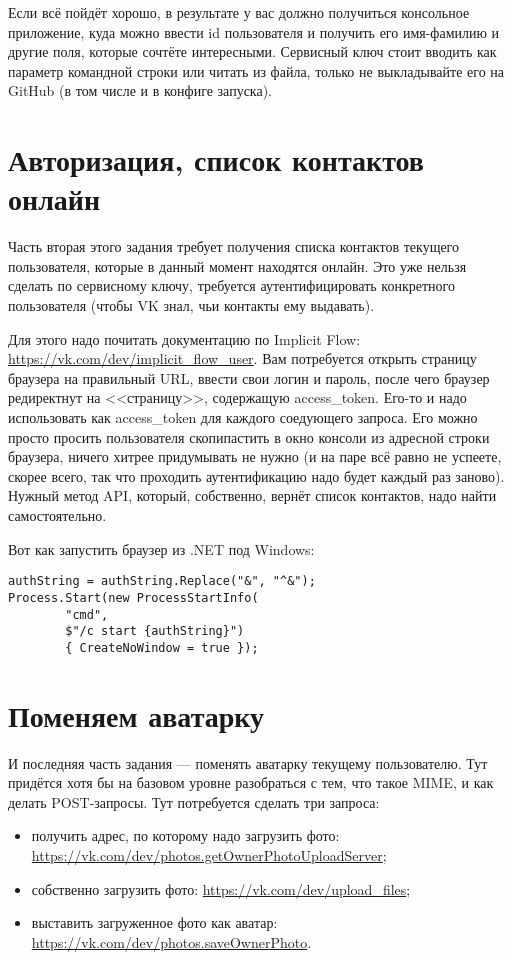 \documentclass[a5paper]{article}
\begin{document}
Если всё пойдёт хорошо, в результате у вас должно получиться консольное приложение, куда можно ввести id пользователя и получить его имя-фамилию и другие поля, которые сочтёте интересными. Сервисный ключ стоит вводить как параметр командной строки или читать из файла, только не выкладывайте его на GitHub (в том числе и в конфиге запуска).

\section{Авторизация, список контактов онлайн}

Часть вторая этого задания требует получения списка контактов текущего пользователя, которые в данный момент находятся онлайн. Это уже нельзя сделать по сервисному ключу, требуется аутентифицировать конкретного пользователя (чтобы VK знал, чьи контакты ему выдавать). 

Для этого надо почитать документацию по Implicit Flow: \url{https://vk.com/dev/implicit_flow_user}. Вам потребуется открыть страницу браузера на правильный URL, ввести свои логин и пароль, после чего браузер редиректнут на <<страницу>>, содержащую access\_token. Его-то и надо использовать как access\_token для каждого соедующего запроса. Его можно просто просить пользователя скопипастить в окно консоли из адресной строки браузера, ничего хитрее придумывать не нужно (и на паре всё равно не успеете, скорее всего, так что проходить аутентификацию надо будет каждый раз заново). Нужный метод API, который, собственно, вернёт список контактов, надо найти самостоятельно.

Вот как запустить браузер из .NET под Windows:

\begin{verbatim}
authString = authString.Replace("&", "^&");
Process.Start(new ProcessStartInfo(
        "cmd", 
        $"/c start {authString}") 
        { CreateNoWindow = true });
\end{verbatim}

\section{Поменяем аватарку}

И последняя часть задания --- поменять аватарку текущему пользователю. Тут придётся хотя бы на базовом уровне разобраться с тем, что такое MIME, и как делать POST-запросы. Тут потребуется сделать три запроса:

\begin{itemize}
    \item получить адрес, по которому надо загрузить фото: \url{https://vk.com/dev/photos.getOwnerPhotoUploadServer};
    \item собственно загрузить фото: \url{https://vk.com/dev/upload_files};
    \item выставить загруженное фото как аватар: \url{https://vk.com/dev/photos.saveOwnerPhoto}.
\end{itemize}
\end{document}
